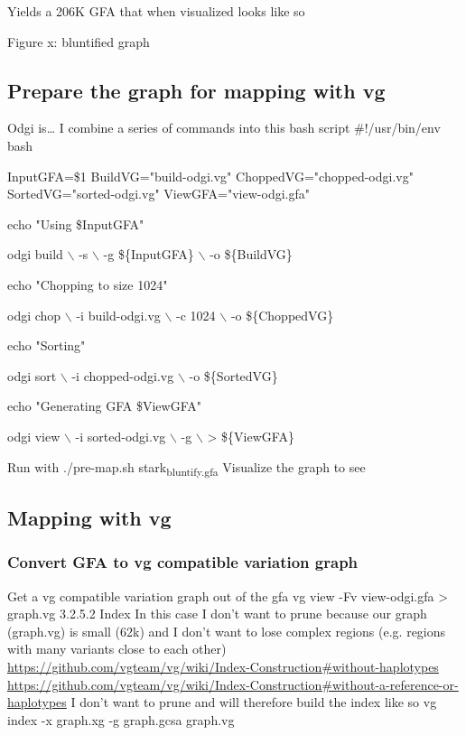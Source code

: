 \documentclass[11pt]{article}
\begin{document}
Yields a  206K GFA that when visualized looks like so

Figure x: bluntified graph 


\subsection{Prepare the graph for mapping with vg}
\label{sec:org7ef6b84}
Odgi is\ldots{}
I combine a series of commands into this bash script
\#!/usr/bin/env bash

InputGFA=\$1
BuildVG="build-odgi.vg"
ChoppedVG="chopped-odgi.vg"
SortedVG="sorted-odgi.vg"
ViewGFA="view-odgi.gfa"

echo "Using \$InputGFA"

odgi build $\backslash$
     -s $\backslash$
     -g \$\{InputGFA\} $\backslash$
     -o \$\{BuildVG\}

echo "Chopping to size 1024"

odgi chop $\backslash$
     -i build-odgi.vg $\backslash$
     -c 1024 $\backslash$
     -o \$\{ChoppedVG\}

echo "Sorting"

odgi sort $\backslash$
     -i chopped-odgi.vg $\backslash$
     -o \$\{SortedVG\}

echo "Generating GFA \$ViewGFA"

odgi view $\backslash$
     -i sorted-odgi.vg $\backslash$
     -g $\backslash$
     > \$\{ViewGFA\}


Run with
./pre-map.sh stark\textsubscript{bluntify.gfa}
Visualize the graph to see


\subsection{Mapping with vg}
\label{sec:orgbed63d9}
\subsubsection{Convert GFA to vg compatible variation graph}
\label{sec:org0016f67}
Get a vg compatible variation graph out of the gfa
vg view -Fv view-odgi.gfa > graph.vg
3.2.5.2 Index
In this case I don’t want to prune because our graph (graph.vg)  is small (62k) and I don’t want to lose complex regions (e.g. regions with many variants close to each other)
\url{https://github.com/vgteam/vg/wiki/Index-Construction\#without-haplotypes}
\url{https://github.com/vgteam/vg/wiki/Index-Construction\#without-a-reference-or-haplotypes}
I don’t want to prune and will therefore build the index like so
vg index -x graph.xg -g graph.gcsa graph.vg
\end{document}
